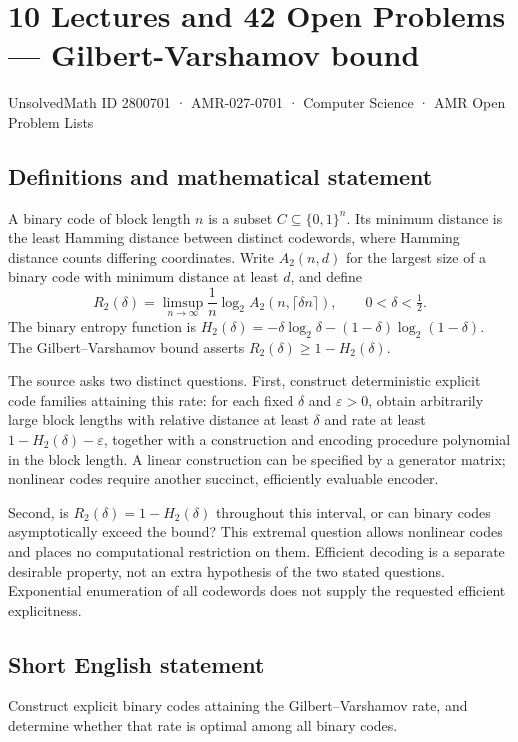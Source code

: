 \documentclass[11pt,a4paper]{article}
\begin{document}
\section*{10 Lectures and 42 Open Problems — Gilbert-Varshamov bound}\label{2800701}
{\small UnsolvedMath ID 2800701 · AMR-027-0701 · Computer Science · AMR Open Problem Lists}
\subsection{Definitions and mathematical statement}
A binary code of block length $n$ is a subset $C\subseteq\{0,1\}^n$.
Its minimum distance is the least Hamming distance between distinct
codewords, where Hamming distance counts differing coordinates.
Write $A_2(n,d)$ for the largest size of a binary code with minimum
distance at least $d$, and define
\[
 R_2(\delta)=\limsup_{n\to\infty}
            \frac1n\log_2 A_2(n,\lceil\delta n\rceil),
 \qquad 0<\delta<\tfrac12.
\]
The binary entropy function is
$H_2(\delta)=-\delta\log_2\delta-(1-\delta)\log_2(1-\delta)$.
The Gilbert--Varshamov bound asserts $R_2(\delta)\ge1-H_2(\delta)$.

The source asks two distinct questions. First, construct deterministic
explicit code families attaining this rate: for each fixed $\delta$
and $\varepsilon>0$, obtain arbitrarily large block lengths with
relative distance at least $\delta$ and rate at least
$1-H_2(\delta)-\varepsilon$, together with a construction and encoding
procedure polynomial in the block length. A linear construction can
be specified by a generator matrix; nonlinear codes require another
succinct, efficiently evaluable encoder.

Second, is $R_2(\delta)=1-H_2(\delta)$ throughout this interval, or can
binary codes asymptotically exceed the bound? This extremal question
allows nonlinear codes and places no computational restriction on
them. Efficient decoding is a separate desirable property, not an
extra hypothesis of the two stated questions. Exponential enumeration
of all codewords does not supply the requested efficient explicitness.
\subsection{Short English statement}
Construct explicit binary codes attaining the Gilbert–Varshamov rate, and determine whether that rate is optimal among all binary codes.
\end{document}
